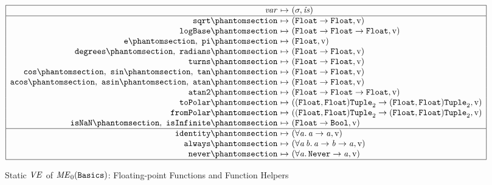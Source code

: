 \begin{figure}[htbp]
\centering
\small
\[
\begin{array}{|r@{\ }c@{\ }l|}
\hline
\var & \mapsto & (\sigma, \is)\\
\hline
\kw{sqrt}\citelabel{b:Basics.sqrt} & \mapsto & (\tFloat \rightarrow \tFloat, \isv)\\
\kw{logBase}\citelabel{b:Basics.logBase} & \mapsto & (\tFloat \rightarrow \tFloat \rightarrow \tFloat, \isv)\\
\kw{e}\citelabel{b:Basics.e},\ \kw{pi}\citelabel{b:Basics.pi} & \mapsto & (\tFloat, \isv)\\
\kw{degrees}\citelabel{b:Basics.degrees},\ \kw{radians}\citelabel{b:Basics.radians} & \mapsto & (\tFloat \rightarrow \tFloat, \isv)\\
\kw{turns}\citelabel{b:Basics.turns} & \mapsto & (\tFloat \rightarrow \tFloat, \isv)\\
\kw{cos}\citelabel{b:Basics.cos},\ \kw{sin}\citelabel{b:Basics.sin},\ \kw{tan}\citelabel{b:Basics.tan} & \mapsto & (\tFloat \rightarrow \tFloat, \isv)\\
\kw{acos}\citelabel{b:Basics.acos},\ \kw{asin}\citelabel{b:Basics.asin},\ \kw{atan}\citelabel{b:Basics.atan} & \mapsto & (\tFloat \rightarrow \tFloat, \isv)\\
\kw{atan2}\citelabel{b:Basics.atan2} & \mapsto & (\tFloat \rightarrow \tFloat \rightarrow \tFloat, \isv)\\
\kw{toPolar}\citelabel{b:Basics.toPolar} & \mapsto & ((\tFloat, \tFloat)\tTuple{2} \rightarrow (\tFloat, \tFloat)\tTuple{2}, \isv)\\
\kw{fromPolar}\citelabel{b:Basics.fromPolar} & \mapsto & ((\tFloat, \tFloat)\tTuple{2} \rightarrow (\tFloat, \tFloat)\tTuple{2}, \isv)\\
\kw{isNaN}\citelabel{b:Basics.isNaN},\ \kw{isInfinite}\citelabel{b:Basics.isInfinite} & \mapsto & (\tFloat \rightarrow \tBool, \isv)\\
\hline
\kw{identity}\citelabel{b:Basics.identity} & \mapsto & (\forall\mv{a}.\,\mv{a} \rightarrow \mv{a}, \isv)\\
\kw{always}\citelabel{b:Basics.always} & \mapsto & (\forall\mv{a}\,\mv{b}.\,\mv{a} \rightarrow \mv{b} \rightarrow \mv{a}, \isv)\\
\kw{never}\citelabel{b:Basics.never} & \mapsto & (\forall\mv{a}.\,\sbtNever \rightarrow \mv{a}, \isv)\\
\hline
\end{array}
\]
\caption{Static $\mathit{VE}$ of $\mathit{ME}_0(\textnormal{\texttt{Basics}})$: Floating-point Functions and
Function Helpers}\label{fig:static-basis-basics-ve2}
\end{figure}

